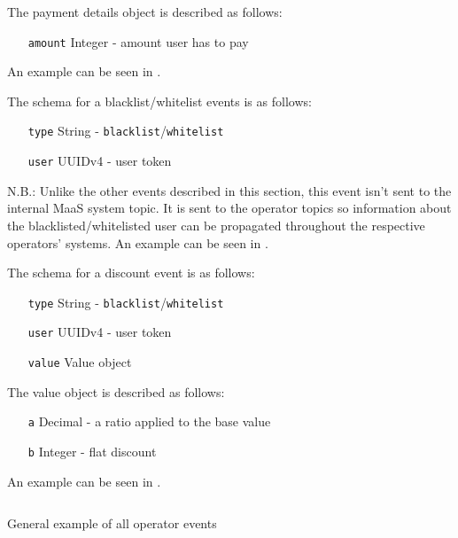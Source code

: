 \documentclass[runningheads,a4]{llncs}
\begin{document}
The payment details object is described as follows:

\begin{itemize}[leftmargin=7em]
  \item[\texttt{amount}] Integer - amount user has to pay
\end{itemize}

An example can be seen in .


The schema for a blacklist/whitelist events is as follows:

\begin{itemize}[leftmargin=7em]
  \item[\texttt{type}] String - \texttt{blacklist}/\texttt{whitelist}
  \item[\texttt{user}] UUIDv4 - user token
\end{itemize}

N.B.: Unlike the other events described in this section, this event isn't sent
to the internal \ac{MaaS} system topic. It is sent to the operator topics so
information about the blacklisted/whitelisted user can be propagated throughout
the respective operators' systems. An example can be seen in
.


The schema for a discount event is as follows:

\begin{itemize}[leftmargin=7em]
  \item[\texttt{type}] String - \texttt{blacklist}/\texttt{whitelist}
  \item[\texttt{user}] UUIDv4 - user token
  \item[\texttt{value}] Value object
\end{itemize}

The value object is described as follows:

\begin{itemize}[leftmargin=7em]
  \item[\texttt{a}] Decimal - a ratio applied to the base value
  \item[\texttt{b}] Integer - flat discount
\end{itemize}

An example can be seen in .




\begin{listing}[htbp]
  \inputminted{json}{src/operator.json} 
  \caption{General example of all operator events}
  \label{lst:json.events.operator}
\end{listing}
\end{document}
